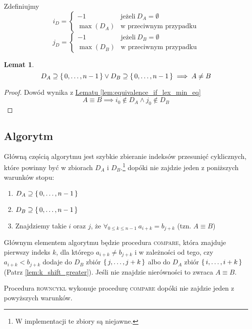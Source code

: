 \documentclass{scrartcl}
\theoremstyle{definition}
\theoremstyle{plain}
\theoremstyle{remark}
\theoremstyle{plain}
\newtheorem{lemma_1_n_in_d_no_equiv}
[lemma_equiv_if_lex_min_eq]{Lemat}
\theoremstyle{definition}
\theoremstyle{plain}
\begin{document}
Zdefiniujmy
\[i_D=\begin{cases}
		-1        & \text{jeżeli}\ D_A=\emptyset  \\
		\max(D_A) & \text{w przeciwnym przypadku}
	\end{cases}\]
\[j_D=\begin{cases}
		-1        & \text{jeżeli}\ D_B=\emptyset  \\
		\max(D_B) & \text{w przeciwnym przypadku}
	\end{cases}\]
\begin{lemma_1_n_in_d_no_equiv}
	\label{lem:1_n_in_d_no_equiv}
	\[D_A\supseteq\set{0,\dots,n-1}\lor
		D_B\supseteq\set{0,\dots,n-1}
		\implies A\neq B\]
\end{lemma_1_n_in_d_no_equiv}
\begin{proof}
	Dowód wynika z
	\hyperref[lem:equivalence_if_lex_min_eq]
	{Lematu \ref*{lem:equivalence_if_lex_min_eq}}
	\[A\equiv B\implies i_0\notin D_A \land j_0\notin D_B\]
\end{proof}
\subsection{Algorytm}
Główną częścią algorytmu jest szybkie zbieranie indeksów
przesunięć cyklicznych, które powinny być
w zbiorach \(D_A\) i \(D_B\).\footnote{
	W implementacji te zbiory są niejawne.
}
dopóki nie zajdzie jeden z poniższych warunków stopu:
\begin{enumerate}[label=(\arabic*)]
	\item \label{term_cond_1} \(D_A\supseteq\set{0,\dots,n-1}\)
	\item \label{term_cond_2}\(D_B\supseteq\set{0,\dots,n-1}\)
	\item \label{term_cond_3}Znajdziemy takie \(i\) oraz \(j\),
	      że \(\forall_{0\le k\le n-1}\ a_{i+k}=b_{j+k}\)
	      (tzn. \(A\equiv B\))
\end{enumerate}
Głównym elementem algorytmu będzie procedura \textsc{compare},
która znajduje pierwszy indeks \(k\),
dla którego \(a_{i+k}\neq b_{j+k}\)
i w zależności od tego, czy \(a_{i+k}<b_{j+k}\)
dodaje do \(D_B\) zbiór \(\set{j,\dots,j+k}\)
albo do \(D_A\) zbiór \(\set{i,\dots,i+k}\)
(Patrz \cref{lem:k_shift_greater}).
Jeśli nie znajdzie nierówności to zwraca \(A\equiv B\).

Procedura \textsc{rowncykl} wykonuje procedurę
\textsc{compare} dopóki nie zajdzie jeden z powyższych warunków.
\pagebreak
\end{document}
